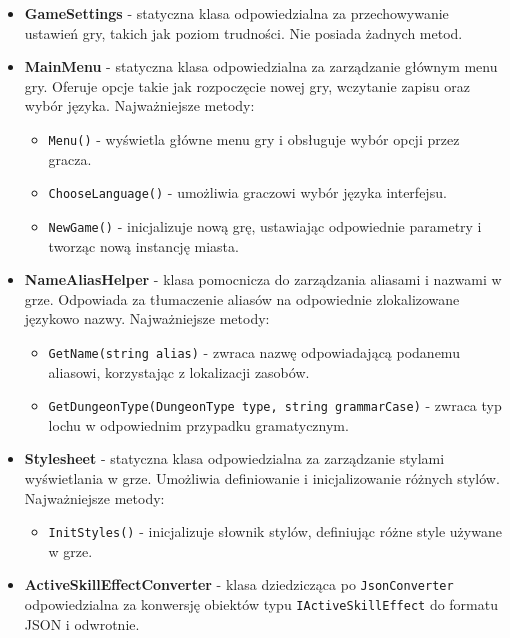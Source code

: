 \begin{itemize}
\begin{itemize}
                    \end{itemize}
                \item \textbf{GameSettings} - statyczna klasa odpowiedzialna za przechowywanie ustawień gry, takich jak poziom trudności. Nie posiada żadnych metod.
                \item \textbf{MainMenu} - statyczna klasa odpowiedzialna za zarządzanie głównym menu gry. Oferuje opcje takie jak rozpoczęcie nowej gry, wczytanie zapisu oraz wybór języka. Najważniejsze metody:
                    \begin{itemize}
                        \item \texttt{Menu()} - wyświetla główne menu gry i obsługuje wybór opcji przez gracza.
                        \item \texttt{ChooseLanguage()} - umożliwia graczowi wybór języka interfejsu.
                        \item \texttt{NewGame()} - inicjalizuje nową grę, ustawiając odpowiednie parametry i tworząc nową instancję miasta.
                    \end{itemize}
                \item \textbf{NameAliasHelper} - klasa pomocnicza do zarządzania aliasami i nazwami w grze. Odpowiada za tłumaczenie aliasów na odpowiednie zlokalizowane językowo nazwy. Najważniejsze metody:
                    \begin{itemize}
                        \item \texttt{GetName(string alias)} - zwraca nazwę odpowiadającą podanemu aliasowi, korzystając z lokalizacji zasobów.
                        \item \texttt{GetDungeonType(DungeonType type, string grammarCase)} - zwraca typ lochu w odpowiednim przypadku gramatycznym.
                    \end{itemize}
                \item \textbf{Stylesheet} - statyczna klasa odpowiedzialna za zarządzanie stylami wyświetlania w grze. Umożliwia definiowanie i inicjalizowanie różnych stylów. Najważniejsze metody:
                    \begin{itemize}
                        \item \texttt{InitStyles()} - inicjalizuje słownik stylów, definiując różne style używane w grze.
                    \end{itemize}
                \item \textbf{ActiveSkillEffectConverter} - klasa dziedzicząca po \texttt{JsonConverter} odpowiedzialna za konwersję obiektów typu \texttt{IActiveSkillEffect} do formatu JSON i odwrotnie. 

\end{itemize}
